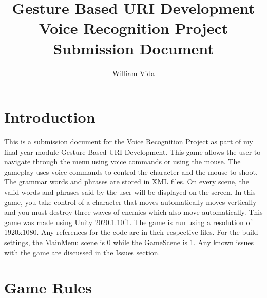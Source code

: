 \documentclass{article}
\title{Gesture Based URI Development \\
Voice Recognition Project \\ 
Submission Document}
\author{William Vida}
\date{}
\begin{document}
\maketitle

\section{Introduction}
This is a submission document for the Voice Recognition Project as part of my final year module Gesture Based URI Development. This game allows the user to navigate through the menu using voice commands or using the mouse. The gameplay uses voice commands to control the character and the mouse to shoot. The grammar words and phrases are stored in XML files. On every scene, the valid words and phrases said by the user will be displayed on the screen. In this game, you take control of a character that moves automatically moves vertically and you must destroy three waves of enemies which also move automatically. This game was made using Unity 2020.1.10f1. The game is run using a resolution of 1920x1080. Any references for the code are in their respective files. For the build settings, the MainMenu scene is 0 while the GameScene is 1. Any known issues with the game are discussed in the \hyperref[sec:issues]{Issues} section.

\section{Game Rules}
\end{document}
